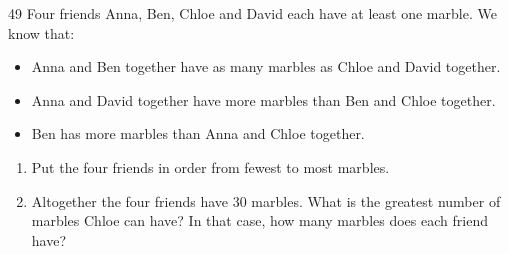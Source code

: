 \begin{probbox}{49}{}
Four friends Anna, Ben, Chloe and David each have at least one marble. We know that:
\begin{itemize}[leftmargin=1.6em,itemsep=0pt]
\item[(1)] Anna and Ben together have as many marbles as Chloe and David together.
\item[(2)] Anna and David together have more marbles than Ben and Chloe together.
\item[(3)] Ben has more marbles than Anna and Chloe together.
\end{itemize}
\begin{enumerate}[label=\alph*),leftmargin=1.6em,itemsep=1pt]
\item Put the four friends in order from fewest to most marbles.
\item Altogether the four friends have $30$ marbles. What is the greatest number of marbles Chloe can have? In that case, how many marbles does each friend have?
\end{enumerate}
\end{probbox}
